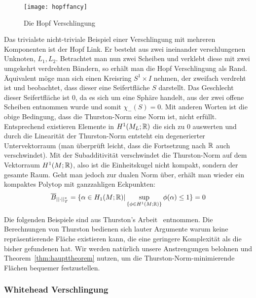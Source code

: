         \begin{wrapfigure}{r}{0.4\textwidth}
            \centering
            \texttt{[image: hopffancy]}
            \caption{Die Hopf Verschlingung}
            \label{fig:hopf}
        \end{wrapfigure}
        Das trivialste nicht-triviale Beispiel einer Verschlingung mit mehreren Komponenten ist der Hopf Link. Er besteht aus zwei ineinander verschlungenen Unknoten, $L_1, L_2$. Betrachtet man nun zwei Scheiben und verklebt diese mit zwei umgekehrt verdrehten Bändern, so erhält man die Hopf Verschlingung als Rand. Äquivalent möge man sich einen Kreisring $S^1 \times I$ nehmen, der zweifach verdreht ist und beobachtet, dass dieser eine Seifertfläche $S$ darstellt. Das Geschlecht dieser Seifertfläche ist $0$, da es sich um eine Sphäre handelt, aus der zwei offene Scheiben entnommen wurde und somit $\chi_-(S)=0$. Mit anderen Worten ist die obige Bedingung, dass die Thurston-Norm eine Norm ist, nicht erfüllt. Entsprechend existieren Elemente in $H^1(M_L;\mathbb{R})$ die sich zu 0 auswerten und durch die Linearität der Thurston-Norm entsteht ein degenerierter Untervektorraum (man überprüft leicht, dass die Fortsetzung nach $\mathbb{R}$ auch verschwindet). Mit der Subadditivität verschwindet die Thurston-Norm auf dem Vektorraum $H^1(M;\mathbb{R})$, also ist die Einheitskugel nicht kompakt, sondern der gesamte Raum. Geht man jedoch zur dualen Norm über, erhält man wieder ein kompaktes Polytop mit ganzzahligen Eckpunkten: 
        \[
              \overline B_{||\cdot||_T^*}= \{\alpha \in H_1(M;\mathbb{R})| \sup_{\{\phi \in H^1(M;\mathbb{R})\}} \phi(\alpha)\leq 1\}=0
        \] 

        Die folgenden Beispiele sind aus Thurston's Arbeit~\cite{Thurston.1986} entnommen. Die Berechnungen von Thurston bedienen sich lauter Argumente warum keine repräsentierende Fläche existieren kann, die eine geringere Komplexität als die bisher gefundenen hat. Wir werden natürlich unsere Anstrengungen belohnen und Theorem~\ref{thm:haupttheorem} nutzen, um die Thurston-Norm-minimierende Flächen bequemer festzustellen.

        \subsubsection*{Whitehead Verschlingung}

